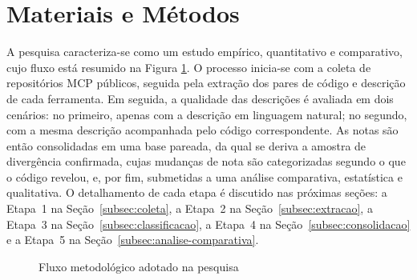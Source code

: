 
\section{Materiais e Métodos}
\label{sec:materiais}

A pesquisa caracteriza-se como um estudo empírico, quantitativo e comparativo, cujo fluxo está resumido na Figura \ref{fig:metodologia}. O processo inicia-se com a coleta de repositórios MCP públicos, seguida pela extração dos pares de código e descrição de cada ferramenta. Em seguida, a qualidade das descrições é avaliada em dois cenários: no primeiro, apenas com a descrição em linguagem natural; no segundo, com a mesma descrição acompanhada pelo código correspondente. As notas são então consolidadas em uma base pareada, da qual se deriva a amostra de divergência confirmada, cujas mudanças de nota são categorizadas segundo o que o código revelou, e, por fim, submetidas a uma análise comparativa, estatística e qualitativa. O detalhamento de cada etapa é discutido nas próximas seções: a Etapa~1 na Seção~\ref{subsec:coleta}, a Etapa~2 na Seção~\ref{subsec:extracao}, a Etapa~3 na Seção~\ref{subsec:classificacao}, a Etapa~4 na Seção~\ref{subsec:consolidacao} e a Etapa~5 na Seção~\ref{subsec:analise-comparativa}.

\begin{figure}[htbp]
    \centering
     
    \caption{Fluxo metodológico adotado na pesquisa}
    \label{fig:metodologia}
\end{figure}

